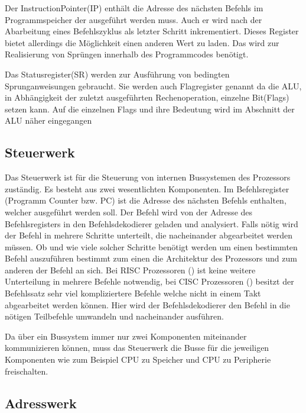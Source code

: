 \documentclass[12pt]{article}
\begin{document}
Der InstructionPointer(IP) enthält die Adresse des nächsten Befehls im Programmspeicher der ausgeführt werden muss. Auch er wird nach der Abarbeitung eines Befehlszyklus als letzter Schritt inkrementiert. Dieses Register bietet allerdings die Möglichkeit einen anderen Wert zu laden. Das wird zur Realisierung von Sprüngen innerhalb des Programmcodes benötigt. 

Das Statusregister(SR) werden zur Ausführung von bedingten Sprunganweisungen gebraucht. Sie werden auch Flagregister genannt da die ALU, in Abhängigkeit der zuletzt ausgeführten Rechenoperation, einzelne Bit(Flags) setzen kann. Auf die einzelnen Flags und ihre Bedeutung wird im Abschnitt der ALU näher eingegangen
\subsection{Steuerwerk}
Das Steuerwerk ist für die Steuerung von internen Bussystemen des Prozessors zuständig. Es besteht aus zwei wesentlichten Komponenten. Im Befehlsregister (Programm Counter bzw. PC) ist die Adresse des nächsten Befehls enthalten, welcher ausgeführt werden soll. Der Befehl wird von der Adresse des Befehlsregisters in den Befehlsdekodierer geladen und analysiert. Falls nötig wird der Befehl in mehrere Schritte unterteilt, die nacheinander abgearbeitet werden müssen. Ob und wie viele solcher Schritte benötigt werden um einen bestimmten Befehl auszuführen bestimmt zum einen die Architektur des Prozessors und zum anderen der Befehl an sich. Bei RISC Prozessoren 
() ist keine weitere Unterteilung in mehrere Befehle notwendig, bei CISC Prozessoren () besitzt der Befehlssatz sehr viel kompliziertere Befehle welche nicht in einem Takt abgearbeitet werden können. Hier wird der Befehlsdekodierer den Befehl in die nötigen Teilbefehle umwandeln und nacheinander ausführen.




Da über ein Bussystem immer nur zwei Komponenten miteinander kommunizieren können, muss das Steuerwerk die Busse für die jeweiligen Komponenten wie zum Beispiel CPU zu Speicher und CPU zu Peripherie freischalten. 
\cite{computerarchitecture2007}

%
\subsection{Adresswerk}
\end{document}
